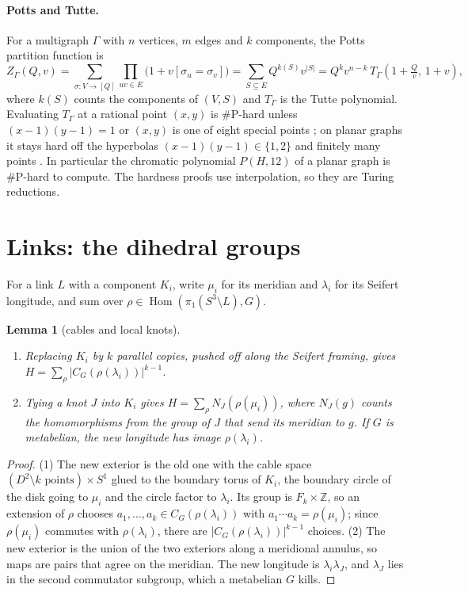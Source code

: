 \documentclass[11pt]{article}
\newtheorem{lemma}[theorem]{Lemma}
\theoremstyle{definition}
\theoremstyle{remark}
\newcommand{\Z}{\mathbb{Z}}
\newcommand{\Hom}{\operatorname{Hom}}
\newcommand{\sharpP}{\#\mathrm{P}}
\begin{document}
\paragraph{Potts and Tutte.} For a multigraph $\Gamma$ with $n$ vertices, $m$
edges and $k$ components, the Potts partition function is
\[
Z_\Gamma(Q,v)=\sum_{\sigma\colon V\to[Q]}\prod_{uv\in E}\bigl(1+v[\sigma_u=\sigma_v]\bigr)
=\sum_{S\subseteq E}Q^{k(S)}v^{|S|}=Q^kv^{n-k}\,T_\Gamma\!\left(1+\tfrac Qv,\,1+v\right),
\]
where $k(S)$ counts the components of $(V,S)$ and $T_\Gamma$ is the Tutte
polynomial. Evaluating $T_\Gamma$ at a rational point $(x,y)$ is
$\sharpP$-hard unless $(x-1)(y-1)=1$ or $(x,y)$ is one of eight special
points \cite{JVW90}; on planar graphs it stays hard off the hyperbolas
$(x-1)(y-1)\in\{1,2\}$ and finitely many points \cite{Ver05}. In particular the
chromatic polynomial $P(H,12)$ of a planar graph is $\sharpP$-hard to compute.
The hardness proofs use interpolation, so they are Turing reductions.

\section{Links: the dihedral groups}\label{sec:links}

For a link $L$ with a component $K_i$, write $\mu_i$ for its meridian and
$\lambda_i$ for its Seifert longitude, and sum over
$\rho\in\Hom(\pi_1(S^3\setminus L),G)$.

\begin{lemma}[cables and local knots]\label{lem:cable}
\begin{enumerate}
\item Replacing $K_i$ by $k$ parallel copies, pushed off along the Seifert
framing, gives $H=\sum_\rho|C_G(\rho(\lambda_i))|^{k-1}$.
\item Tying a knot $J$ into $K_i$ gives $H=\sum_\rho N_J(\rho(\mu_i))$, where
$N_J(g)$ counts the homomorphisms from the group of $J$ that send its meridian
to $g$. If $G$ is metabelian, the new longitude has image $\rho(\lambda_i)$.
\end{enumerate}
\end{lemma}

\begin{proof}
(1) The new exterior is the old one with the cable space
$(D^2\setminus k\text{ points})\times S^1$ glued to the boundary torus of $K_i$,
the boundary circle of the disk going to $\mu_i$ and the circle factor to
$\lambda_i$. Its group is $F_k\times\Z$, so an extension of $\rho$ chooses
$a_1,\dots,a_k\in C_G(\rho(\lambda_i))$ with $a_1\cdots a_k=\rho(\mu_i)$; since
$\rho(\mu_i)$ commutes with $\rho(\lambda_i)$, there are $|C_G(\rho(\lambda_i))|^{k-1}$
choices. (2) The new exterior is the union of the two exteriors along a
meridional annulus, so maps are pairs that agree on the meridian. The new
longitude is $\lambda_i\lambda_J$, and $\lambda_J$ lies in the second commutator
subgroup, which a metabelian $G$ kills.
\end{proof}
\end{document}
